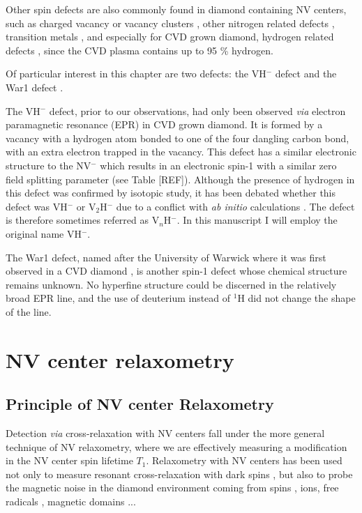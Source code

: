 \documentclass[a4paper]{report}
\begin{document}
Other spin defects are also commonly found in diamond containing NV centers, such as charged vacancy or vacancy clusters \citep{hounsome2006origin}, other nitrogen related defects \citep{newton2007epr}, transition metals \citep{isoya1990fourier}, and especially for CVD grown diamond, hydrogen related defects \citep{hartland2014study}, since the CVD plasma contains up to 95 \% hydrogen.

Of particular interest in this chapter are two defects: the VH$^-$ defect \citep{glover2003hydrogen, glover2004hydrogen} and the War1 defect \citep{cruddace2007magnetic}. 

The VH$^-$ defect, prior to our observations, had only been observed \textit{via} electron paramagnetic resonance (EPR) in CVD grown diamond. It is formed by a vacancy with a hydrogen atom bonded to one of the four dangling carbon bond, with an extra electron trapped in the vacancy. This defect has a similar electronic structure to the NV$^-$ which results in an electronic spin-1 with a similar zero field splitting parameter (see Table [REF]). Although the presence of hydrogen in this defect was confirmed by isotopic study, it has been debated whether this defect was VH$^-$ or V$_2$H$^-$ due to a conflict with \textit{ab initio} calculations \citep{shaw2005importance}. The defect is therefore sometimes referred as V$_n$H$^-$. In this manuscript I will employ the original name VH$^-$.

The War1 defect, named after the University of Warwick where it was first observed in a CVD diamond \citep{cruddace2007magnetic}, is another spin-1 defect whose chemical structure remains unknown. No hyperfine structure could be discerned in the relatively broad EPR line, and the use of deuterium instead of $^1$H did not change the shape of the line.

\section{NV center relaxometry}

\subsection{Principle of NV center Relaxometry}
Detection \textit{via} cross-relaxation	with NV centers fall under the more general technique of NV relaxometry, where we are effectively measuring a modification in the NV center spin lifetime $T_1$. Relaxometry with NV centers has been used not only to measure resonant cross-relaxation with dark spins \citep{van1989cross,holliday1989optical,armstrong2010nv, hall2016detection,wickenbrock2016microwave,  wood2016wide,  alfasi2019detection, lazda2021cross}, but also to probe the magnetic noise in the diamond environment coming from spins \citep{steinert2013magnetic}, ions\citep{tetienne2013spin}, free radicals \citep{nie2021quantum}, magnetic domains \citep{finco2021imaging}...
\end{document}
